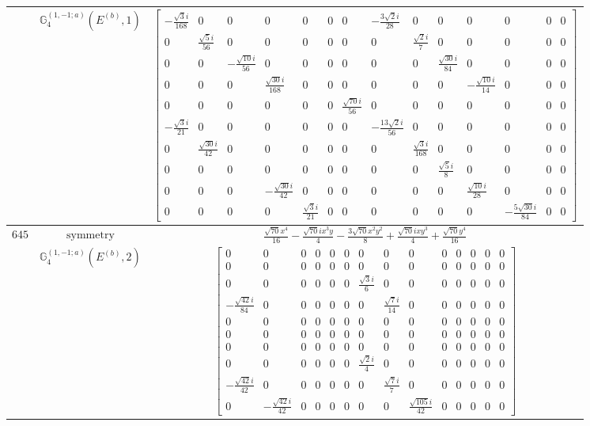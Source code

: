 \documentclass[fleqn,8pt,landscape]{jsarticle}
\begin{document}
\begin{longtable}{ccc}
$  $ & $ \mathbb{G}_{4}^{(1,-1;a)}(E^{(b)},1) $ & $ \begin{bmatrix} - \frac{\sqrt{3} i}{168} & 0 & 0 & 0 & 0 & 0 & 0 & - \frac{3 \sqrt{2} i}{28} & 0 & 0 & 0 & 0 & 0 & 0 \\ 0 & \frac{\sqrt{5} i}{56} & 0 & 0 & 0 & 0 & 0 & 0 & \frac{\sqrt{2} i}{7} & 0 & 0 & 0 & 0 & 0 \\ 0 & 0 & - \frac{\sqrt{10} i}{56} & 0 & 0 & 0 & 0 & 0 & 0 & \frac{\sqrt{30} i}{84} & 0 & 0 & 0 & 0 \\ 0 & 0 & 0 & \frac{\sqrt{30} i}{168} & 0 & 0 & 0 & 0 & 0 & 0 & - \frac{\sqrt{10} i}{14} & 0 & 0 & 0 \\ 0 & 0 & 0 & 0 & 0 & 0 & \frac{\sqrt{70} i}{56} & 0 & 0 & 0 & 0 & 0 & 0 & 0 \\ - \frac{\sqrt{3} i}{21} & 0 & 0 & 0 & 0 & 0 & 0 & - \frac{13 \sqrt{2} i}{56} & 0 & 0 & 0 & 0 & 0 & 0 \\ 0 & \frac{\sqrt{30} i}{42} & 0 & 0 & 0 & 0 & 0 & 0 & \frac{\sqrt{3} i}{168} & 0 & 0 & 0 & 0 & 0 \\ 0 & 0 & 0 & 0 & 0 & 0 & 0 & 0 & 0 & \frac{\sqrt{5} i}{8} & 0 & 0 & 0 & 0 \\ 0 & 0 & 0 & - \frac{\sqrt{30} i}{42} & 0 & 0 & 0 & 0 & 0 & 0 & \frac{\sqrt{10} i}{28} & 0 & 0 & 0 \\ 0 & 0 & 0 & 0 & \frac{\sqrt{3} i}{21} & 0 & 0 & 0 & 0 & 0 & 0 & - \frac{5 \sqrt{30} i}{84} & 0 & 0 \end{bmatrix} $ \\ \hline
$ 645 $ & $ \text{symmetry} $ & $ \frac{\sqrt{70} x^{4}}{16} - \frac{\sqrt{70} i x^{3} y}{4} - \frac{3 \sqrt{70} x^{2} y^{2}}{8} + \frac{\sqrt{70} i x y^{3}}{4} + \frac{\sqrt{70} y^{4}}{16} $ \\
$  $ & $ \mathbb{G}_{4}^{(1,-1;a)}(E^{(b)},2) $ & $ \begin{bmatrix} 0 & 0 & 0 & 0 & 0 & 0 & 0 & 0 & 0 & 0 & 0 & 0 & 0 & 0 \\ 0 & 0 & 0 & 0 & 0 & 0 & 0 & 0 & 0 & 0 & 0 & 0 & 0 & 0 \\ 0 & 0 & 0 & 0 & 0 & 0 & \frac{\sqrt{3} i}{6} & 0 & 0 & 0 & 0 & 0 & 0 & 0 \\ - \frac{\sqrt{42} i}{84} & 0 & 0 & 0 & 0 & 0 & 0 & \frac{\sqrt{7} i}{14} & 0 & 0 & 0 & 0 & 0 & 0 \\ 0 & 0 & 0 & 0 & 0 & 0 & 0 & 0 & 0 & 0 & 0 & 0 & 0 & 0 \\ 0 & 0 & 0 & 0 & 0 & 0 & 0 & 0 & 0 & 0 & 0 & 0 & 0 & 0 \\ 0 & 0 & 0 & 0 & 0 & 0 & 0 & 0 & 0 & 0 & 0 & 0 & 0 & 0 \\ 0 & 0 & 0 & 0 & 0 & 0 & \frac{\sqrt{2} i}{4} & 0 & 0 & 0 & 0 & 0 & 0 & 0 \\ - \frac{\sqrt{42} i}{42} & 0 & 0 & 0 & 0 & 0 & 0 & \frac{\sqrt{7} i}{7} & 0 & 0 & 0 & 0 & 0 & 0 \\ 0 & - \frac{\sqrt{42} i}{42} & 0 & 0 & 0 & 0 & 0 & 0 & \frac{\sqrt{105} i}{42} & 0 & 0 & 0 & 0 & 0 \end{bmatrix} $ \\ \hline

\end{longtable}
\end{document}
